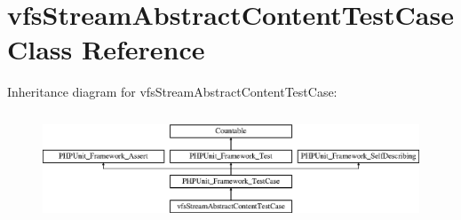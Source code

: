 \hypertarget{classorg_1_1bovigo_1_1vfs_1_1vfs_stream_abstract_content_test_case}{}\section{vfs\+Stream\+Abstract\+Content\+Test\+Case Class Reference}
\label{classorg_1_1bovigo_1_1vfs_1_1vfs_stream_abstract_content_test_case}
Inheritance diagram for vfs\+Stream\+Abstract\+Content\+Test\+Case\+:\begin{figure}[H]
\begin{center}
\leavevmode
\includegraphics[height=3.303835cm]{classorg_1_1bovigo_1_1vfs_1_1vfs_stream_abstract_content_test_case}
\end{center}
\end{figure}
